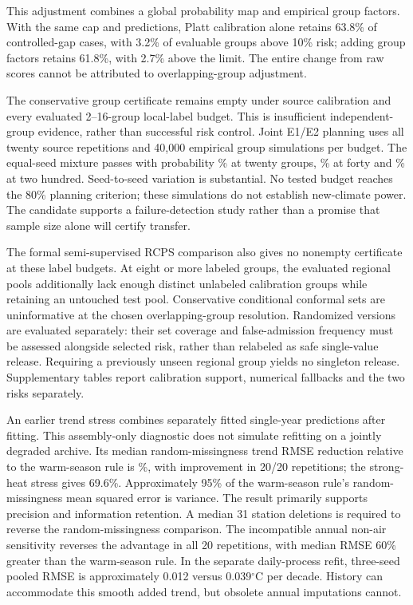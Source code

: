 \documentclass[draft,linenumbers]{agujournal2025}
\begin{document}
This adjustment combines a global probability map and empirical group factors. With the same cap and predictions, Platt calibration alone retains 63.8\% of controlled-gap cases, with 3.2\% of evaluable groups above 10\% risk; adding group factors retains 61.8\%, with 2.7\% above the limit. The entire change from raw scores cannot be attributed to overlapping-group adjustment.

The conservative group certificate remains empty under source calibration and every evaluated 2--16-group local-label budget. This is insufficient independent-group evidence, rather than successful risk control. Joint E1/E2 planning uses all twenty source repetitions and 40,000 empirical group simulations per budget. The equal-seed mixture passes with probability \RPlanTwenty\% at twenty groups, \RPlanForty\% at forty and \RPlanTwoHundred\% at two hundred. Seed-to-seed variation is substantial. No tested budget reaches the 80\% planning criterion; these simulations do not establish new-climate power. The candidate supports a failure-detection study rather than a promise that sample size alone will certify transfer.

The formal semi-supervised RCPS comparison also gives no nonempty certificate at these label budgets. At eight or more labeled groups, the evaluated regional pools additionally lack enough distinct unlabeled calibration groups while retaining an untouched test pool. Conservative conditional conformal sets are uninformative at the chosen overlapping-group resolution. Randomized versions are evaluated separately: their set coverage and false-admission frequency must be assessed alongside selected risk, rather than relabeled as safe single-value release. Requiring a previously unseen regional group yields no singleton release. Supplementary tables report calibration support, numerical fallbacks and the two risks separately.

An earlier trend stress combines separately fitted single-year predictions after fitting. This assembly-only diagnostic does not simulate refitting on a jointly degraded archive. Its median random-missingness trend RMSE reduction relative to the warm-season rule is \RTrendGain\%, with improvement in 20/20 repetitions; the strong-heat stress gives 69.6\%. Approximately 95\% of the warm-season rule's random-missingness mean squared error is variance. The result primarily supports precision and information retention. A median 31 station deletions is required to reverse the random-missingness comparison. The incompatible annual non-air sensitivity reverses the advantage in all 20 repetitions, with median RMSE 60\% greater than the warm-season rule. In the separate daily-process refit, three-seed pooled RMSE is approximately 0.012 versus 0.039$^{\circ}$C per decade. History can accommodate this smooth added trend, but obsolete annual imputations cannot.
\end{document}
